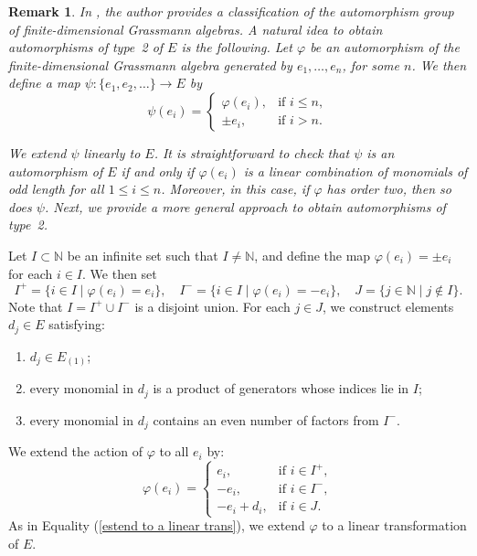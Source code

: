 \documentclass{article}
\newtheorem{remark}[theorem]{Remark}
\begin{document}
	
	\begin{remark}
		In \cite{makar}, the author provides a classification of the automorphism group of finite-dimensional Grassmann algebras. 
		A natural idea to obtain automorphisms of type~2 of $E$ is the following. 
		Let $\varphi$ be an automorphism of the finite-dimensional Grassmann algebra generated by $e_{1},\ldots,e_{n}$, for some $n$. 
		We then define a map $\psi \colon \{e_{1}, e_{2}, \ldots\} \to E$ by
		\[
		\psi(e_{i}) =
		\begin{cases}
			\varphi(e_{i}), & \text{if } i \leq n, \\[4pt]
			\pm e_{i}, & \text{if } i > n .
		\end{cases}
		\]
		
		We extend $\psi$ linearly to $E$. 
		It is straightforward to check that $\psi$ is an automorphism of $E$ if and only if $\varphi(e_{i})$ is a linear combination of monomials of odd length for all $1 \leq i \leq n$. 
		Moreover, in this case, if $\varphi$ has order two, then so does $\psi$. 
		Next, we provide a more general approach to obtain automorphisms of type~2.
	\end{remark}
	
	
	
	
	
	
	
	
	Let $I \subset \mathbb{N}$ be an infinite set such that $I \neq \mathbb{N}$, 
	and define the map $\varphi(e_i) = \pm e_i$ for each $i \in I$. 
	We then set
	\[
	I^+ = \{i \in I \mid \varphi(e_i) = e_i\}, \quad 
	I^- = \{i \in I \mid \varphi(e_i) = -e_i\}, \quad
	J = \{j \in \mathbb{N} \mid j \notin I\}.
	\]
	Note that $I = I^+ \cup I^-$ is a disjoint union.  
	For each $j \in J$, we construct elements $d_j \in E$ satisfying:
	\begin{enumerate}
		\item[(1)] $d_j \in E_{(1)}$;
		\item[(2)] every monomial in $d_j$ is a product of generators whose indices lie in $I$;
		\item[(3)] every monomial in $d_j$ contains an even number of factors from $I^-$.
	\end{enumerate}
	
	We extend the action of $\varphi$ to all $e_i$ by:
	\[
	\varphi(e_i) = 
	\begin{cases}
		e_i, & \text{if } i \in I^+, \\[2pt]
		-e_i, & \text{if } i \in I^-, \\[2pt]
		-e_i + d_i, & \text{if } i \in J.
	\end{cases}
	\]
	As in Equality (\ref{estend to a linear trans}), we extend $\varphi$ to a linear transformation of $E$.
	
\end{document}
